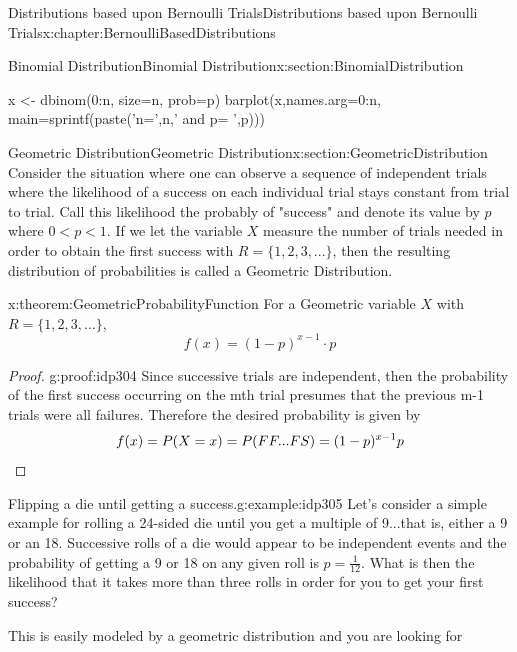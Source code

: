 \documentclass[oneside,10pt,]{book}
\newcommand{\qedhere}{\relax}
\numberwithin{equation}{section}
\newcommand{\lt}{<}
\begin{document}
\begin{chapterptx}{Distributions based upon Bernoulli Trials}{}{Distributions based upon Bernoulli Trials}{}{}{x:chapter:BernoulliBasedDistributions}
\begin{sectionptx}{Binomial Distribution}{}{Binomial Distribution}{}{}{x:section:BinomialDistribution}
\begin{sageinput}
x <- dbinom(0:n, size=n, prob=p)
barplot(x,names.arg=0:n, main=sprintf(paste('n=',n,' and p= ',p)))
\end{sageinput}
%
\end{sectionptx}
%
%
\typeout{************************************************}
\typeout{************************************************}
%
\begin{sectionptx}{Geometric Distribution}{}{Geometric Distribution}{}{}{x:section:GeometricDistribution}
Consider the situation where one can observe a sequence  of independent trials where the likelihood of a success on each individual trial stays constant from trial to trial. Call this likelihood the probably of "success" and denote its value by \(p\) where \(0 \lt p \lt 1 \). If we let the variable \(X\) measure the number of trials needed in order to obtain the first success with \(R = \{1, 2, 3, ... \}\), then the resulting distribution of probabilities is called a Geometric Distribution.%
\par
\begin{theorem}{}{}{x:theorem:GeometricProbabilityFunction}%
For a Geometric variable \(X\) with \(R = \{1, 2, 3, ... \}\),%
\begin{equation*}
f(x) = (1-p)^{x-1} \cdot p
\end{equation*}
%
\end{theorem}
\begin{proof}{}{g:proof:idp304}
Since successive trials are independent, then the probability of the first success occurring on the mth trial presumes that the previous m-1 trials were all failures.  Therefore the desired probability is given by%
\begin{equation*}
f(x) = P(X = x) = P(FF...FS) = (1-p)^{x-1}p\qedhere
\end{equation*}
%
\end{proof}
%
\begin{example}{Flipping a die until getting a success.}{g:example:idp305}%
Let's consider a simple example for rolling a 24-sided die until you get a multiple of 9...that is, either a 9 or an 18. Successive rolls of a die would appear to be independent events and the probability of getting a 9 or 18 on any given roll is \(p = \frac{1}{12}\). What is then the likelihood that it takes more than three rolls in order for you to get your first success?%
\par
This is easily modeled by a geometric distribution and you are looking for%
\begin{equation*}

\end{equation*}
\end{example}
\end{sectionptx}
\end{chapterptx}
\end{document}
